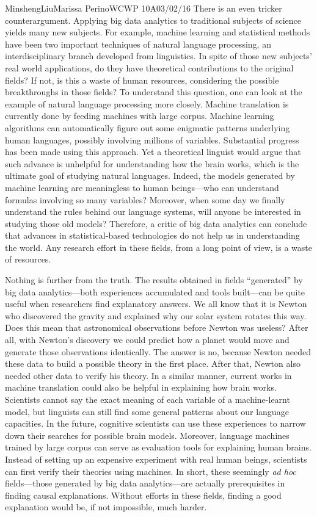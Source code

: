 \documentclass[12pt,letterpaper]{article}
\begin{document}
\begin{mla}{Minsheng}{Liu}{Marissa Perino}{WCWP 10A}{03/02/16}
There is an even tricker counterargument. Applying big data analytics to
traditional subjects of science yields many new subjects. For example,
machine learning and statistical methods have been two important
techniques of natural language processing, an interdisciplinary branch
developed from linguistics. In spite of those new subjects' real world
applications, do they have theoretical contributions to the original
fields? If not, is this a waste of human resources, considering the
possible breakthroughs in those fields? To understand this question, one
can look at the example of natural language processing more closely.
Machine translation is currently done by feeding machines with large
corpus. Machine learning algorithms can automatically figure out some
enigmatic patterns underlying human languages, possibly involving
millions of variables. Substantial progress has been made using this
approach. Yet a theoretical linguist would argue that such advance is
unhelpful for understanding how the brain works, which is the ultimate
goal of studying natural languages. Indeed, the models generated by
machine learning are meaningless to human beings---who can understand
formulas involving so many variables? Moreover, when some day we finally
understand the rules behind our language systems, will anyone be
interested in studying those old models? Therefore, a critic of big data
analytics can conclude that advances in statistical-based technologies
do not help us in understanding the world. Any research effort in these
fields, from a long point of view, is a waste of resources.

Nothing is further from the truth. The results obtained in fields
``generated'' by big data analytics---both experiences accumulated and
tools built---can be quite useful when researchers find explanatory
answers. We all know that it is Newton who discovered the gravity and
explained why our solar system rotates this way. Does this mean that
astronomical observations before Newton was useless? After all, with
Newton's discovery we could predict how a planet would move and generate
those observations identically. The answer is no, because Newton needed
these data to build a possible theory in the first place. After that,
Newton also needed other data to verify his theory. In a similar manner,
current works in machine translation could also be helpful in explaining
how brain works. Scientists cannot say the exact meaning of each
variable of a machine-learnt model, but linguists can still find some
general patterns about our language capacities. In the future, cognitive
scientists can use these experiences to narrow down their searches for
possible brain models. Moreover, language machines trained by large
corpus can serve as evaluation tools for explaining human brains.
Instead of setting up an expensive experiment with real human beings,
scientists can first verify their theories using machines. In short,
these seemingly \emph{ad hoc} fields---those generated by big data
analytics---are actually prerequisites in finding causal explanations.
Without efforts in these fields, finding a good explanation would be, if
not impossible, much harder.


\end{mla}
\end{document}
